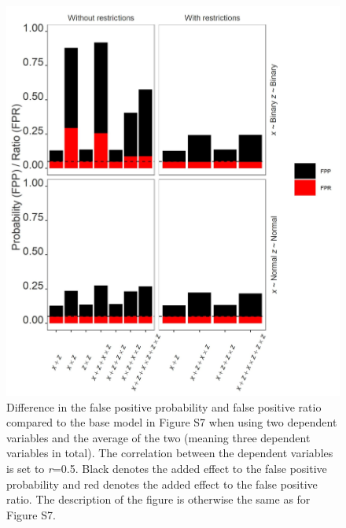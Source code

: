 \begin{figure}[hbt!]
\includegraphics{R/Analysis/Result/Figures/Figure3SIBon.jpeg}
\centering
\caption{Difference in the false positive probability and false positive ratio compared to the base model in Figure S7 when using two dependent variables and the average of the two (meaning three dependent variables in total). The correlation between the dependent variables is set to \textit{r}=0.5. Black denotes the added effect to the false positive probability and red denotes the added effect to the false positive ratio.  The description of the figure is otherwise the same as for Figure S7.}
\label{fig:mainfigure}
\end{figure}


